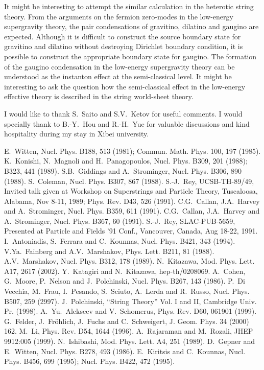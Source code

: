 \documentclass[a4paper,prd,preprint]{revtex4}
\begin{document}
It might be interesting
 to attempt the similar calculation in the heterotic string theory.
From the arguments
 on the fermion zero-modes in the low-energy supergravity theory,
 the pair condensations of gravitino, dilatino and gaugino
 are expected.
Although it is difficult to construct
 the source boundary state for gravitino and dilatino
 without destroying Dirichlet boundary condition,
 it is possible to construct the appropriate boundary state
 for gaugino.
The formation of the gaugino condensation
 in the low-energy supergravity theory can be understood
 as the instanton effect at the semi-classical level.
It might be interesting to ask the question
 how the semi-classical effect in the low-energy effective theory
 is described in the string world-sheet theory. 

\acknowledgments

I would like to thank
 S.~Saito and S.V.~Ketov for useful comments.
I would specially thank to B.-Y.~Hou and R.-H.~Yue
 for valuable discussions and kind hospitality
 during my stay in Xibei university.


\begin{references}
 E.~Witten, Nucl. Phys. B188, 513 (1981);
 Commun. Math. Phys. 100, 197 (1985).
 K.~Konishi, N.~Magnoli and H.~Panagopoulos,
 Nucl. Phys. B309, 201 (1988); B323, 441 (1989).
 S.B.~Giddings and A.~Strominger, Nucl. Phys. B306, 890 (1988).
 S.~Coleman, Nucl. Phys. B307, 867 (1988).
 S.-J.~Rey, UCSB-TH-89/49,
 Invited talk given at Workshop on Superstrings and Particle Theory,
 Tuscaloosa, Alabama, Nov 8-11, 1989;
 Phys. Rev. D43, 526 (1991).
 C.G.~Callan, J.A.~Harvey and A.~Strominger,
 Nucl. Phys. B359, 611 (1991).
 C.G.~Callan, J.A.~Harvey and A.~Strominger,
 Nucl. Phys. B367, 60 (1991).
 S.-J.~Rey, SLAC-PUB-5659,
 Presented at Particle and Fields '91 Conf.,
 Vancouver, Canada, Aug 18-22, 1991.
 I.~Antoniadis, S.~Ferrara and C.~Kounnas,
 Nucl. Phys. B421, 343 (1994).
 V.Ya.~Fainberg and A.V.~Marshakov, Phys. Lett. B211, 81 (1988).
 A.V.~Marshakov, Nucl. Phys. B312, 178 (1989).
 N.~Kitazawa, Mod. Phys. Lett. A17, 2617 (2002).
 Y.~Katagiri and N.~Kitazawa, hep-th/0208069.
 A.~Cohen, G.~Moore, P.~Nelson and J.~Polchinski,
 Nucl. Phys. B267, 143 (1986).
 P.~Di Vecchia, M.~Frau, I.~Pesando, S.~Sciuto, A.~Lerda and R.~Russo,
 Nucl. Phys. B507, 259 (2997).
 J.~Polchinski, ``String Theory'' Vol. I and II,
 Cambridge Univ. Pr. (1998).
 A.~Yu.~Alekseev and V.~Schomerus, Phys. Rev. D60, 061901 (1999).
 G.~Felder, J.~Fr\"ohlich, J.~Fuchs and C.~Schweigert,
 J. Geom. Phys. 34 (2000) 162.
 M.~Li, Phys. Rev. D54, 1644 (1996).
 A.~Rajaraman and M.~Rozali, JHEP 9912:005 (1999).
 N.~Ishibashi, Mod. Phys. Lett. A4, 251 (1989).
 D.~Gepner and E.~Witten, Nucl. Phys. B278, 493 (1986).
 E.~Kiritsis and C.~Kounnas,
 Nucl. Phys. B456, 699 (1995); Nucl. Phys. B422, 472 (1995).
\end{references}
\end{document}

